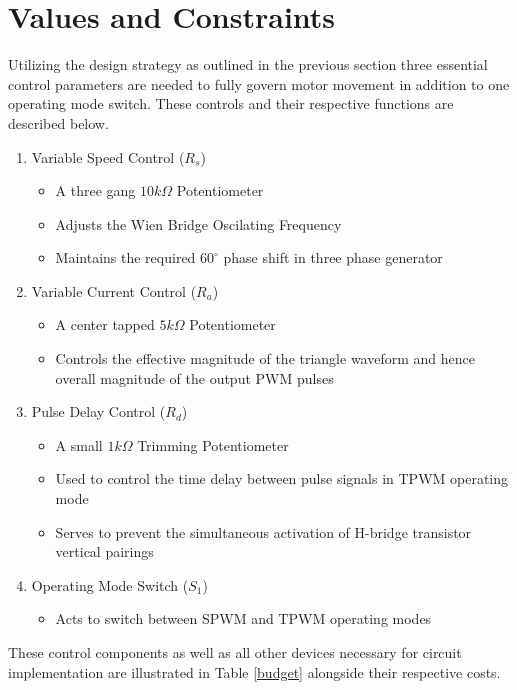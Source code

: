 \documentclass[12pt]{article}
\begin{document}
\section{Values and Constraints}%

Utilizing the design strategy as outlined in the previous section three essential control parameters are needed to fully govern motor movement in addition to one operating mode switch. These controls and their respective functions are described below.

\begin{enumerate}
\item Variable Speed Control ($R_s$)
    \begin{itemize}
     \item A three gang $10k\Omega$ Potentiometer 
     \item Adjusts the Wien Bridge Oscilating Frequency
     \item Maintains the required $60^{\circ}$ phase shift in three phase generator
    \end{itemize}
\item Variable Current Control ($R_a$)
    \begin{itemize}
    \item A center tapped $5k\Omega$ Potentiometer
    \item Controls the effective magnitude of the triangle waveform and hence overall magnitude of the output PWM pulses
    \end{itemize}
\item Pulse Delay Control ($R_d$)
    \begin{itemize}
    \item A small $1k\Omega$ Trimming Potentiometer
    \item Used to control the time delay between pulse signals in TPWM operating mode
    \item Serves to prevent the simultaneous activation of H-bridge transistor vertical pairings
    \end{itemize}
\item Operating Mode Switch ($S_1$)
    \begin{itemize}
    \item Acts to switch between SPWM and TPWM operating modes
    \end{itemize}
\end{enumerate}

These control components as well as all other devices necessary for circuit implementation are illustrated in Table \ref{budget} alongside their respective costs.
\end{document}
